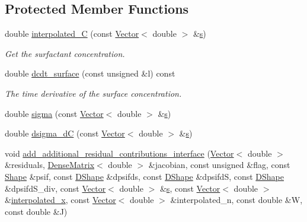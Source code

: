 \subsection*{Protected Member Functions}
\begin{DoxyCompactItemize}
\item 
double \hyperlink{classoomph_1_1SurfactantTransportInterfaceElement_a9da12df06b20e5f1ce0736acfc7e8d83}{interpolated\+\_\+C} (const \hyperlink{classoomph_1_1Vector}{Vector}$<$ double $>$ \&\hyperlink{cfortran_8h_ab7123126e4885ef647dd9c6e3807a21c}{s})
\begin{DoxyCompactList}\small\item\em Get the surfactant concentration. \end{DoxyCompactList}\item 
double \hyperlink{classoomph_1_1SurfactantTransportInterfaceElement_a7b5cc851b94d836a3caa2130cbf45bec}{dcdt\+\_\+surface} (const unsigned \&l) const
\begin{DoxyCompactList}\small\item\em The time derivative of the surface concentration. \end{DoxyCompactList}\item 
double \hyperlink{classoomph_1_1SurfactantTransportInterfaceElement_a1710057c610ccccc06ef41f34f086aae}{sigma} (const \hyperlink{classoomph_1_1Vector}{Vector}$<$ double $>$ \&\hyperlink{cfortran_8h_ab7123126e4885ef647dd9c6e3807a21c}{s})
\item 
double \hyperlink{classoomph_1_1SurfactantTransportInterfaceElement_ad39e6040101db7d9338928b3c2343623}{dsigma\+\_\+dC} (const \hyperlink{classoomph_1_1Vector}{Vector}$<$ double $>$ \&\hyperlink{cfortran_8h_ab7123126e4885ef647dd9c6e3807a21c}{s})
\item 
void \hyperlink{classoomph_1_1SurfactantTransportInterfaceElement_adedf33390efdf652e169f8bd38eb2350}{add\+\_\+additional\+\_\+residual\+\_\+contributions\+\_\+interface} (\hyperlink{classoomph_1_1Vector}{Vector}$<$ double $>$ \&residuals, \hyperlink{classoomph_1_1DenseMatrix}{Dense\+Matrix}$<$ double $>$ \&jacobian, const unsigned \&flag, const \hyperlink{classoomph_1_1Shape}{Shape} \&psif, const \hyperlink{classoomph_1_1DShape}{D\+Shape} \&dpsifds, const \hyperlink{classoomph_1_1DShape}{D\+Shape} \&dpsifdS, const \hyperlink{classoomph_1_1DShape}{D\+Shape} \&dpsifd\+S\+\_\+div, const \hyperlink{classoomph_1_1Vector}{Vector}$<$ double $>$ \&\hyperlink{cfortran_8h_ab7123126e4885ef647dd9c6e3807a21c}{s}, const \hyperlink{classoomph_1_1Vector}{Vector}$<$ double $>$ \&\hyperlink{classoomph_1_1FaceElement_a7aa612fec3604e08344503fbcdc357c8}{interpolated\+\_\+x}, const \hyperlink{classoomph_1_1Vector}{Vector}$<$ double $>$ \&interpolated\+\_\+n, const double \&W, const double \&J)

\end{DoxyCompactItemize}
